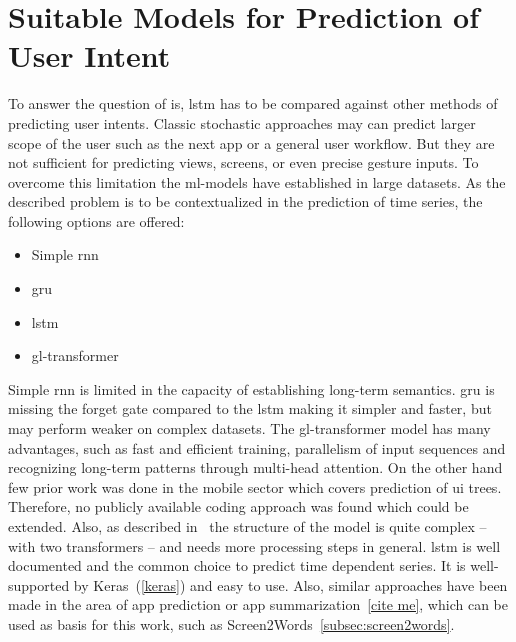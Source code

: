 

\section{Suitable Models for Prediction of User Intent}

To answer the question of  is, \gls{lstm} has to be compared against other methods of predicting user intents.
Classic stochastic approaches may can predict larger scope of the user such as the next app or a general user workflow.
But they are not sufficient for predicting views, screens, or even precise gesture inputs.
To overcome this limitation the \gls{ml}-models have established in large datasets.
As the described problem is to be contextualized in the prediction of time series, the following options are offered:
\begin{itemize}
    \item Simple \gls{rnn}
    \item \gls{gru}
    \item \gls{lstm}
    \item \gls{gl-transformer}
\end{itemize}

Simple \gls{rnn} is limited in the capacity of establishing long-term semantics.
\gls{gru} is missing the forget gate compared to the \gls{lstm} making it simpler and faster, but may perform weaker on complex datasets.
The \gls{gl-transformer} model has many advantages, such as fast and efficient training, parallelism of input sequences and recognizing long-term patterns through multi-head attention.
On the other hand few prior work was done in the mobile sector which covers prediction of \gls{ui} trees.
Therefore, no publicly available coding approach was found which could be extended.
Also, as described in~\cite{zhou2021large} the structure of the model is quite complex -- with two transformers -- and needs more processing steps in general.
\gls{lstm} is well documented and the common choice to predict time dependent series.
It is well-supported by Keras~(\ref{keras}) and easy to use.
Also, similar approaches have been made in the area of app prediction or app summarization~\ref{cite me}, which can be used as basis for this work, such as Screen2Words~\ref{subsec:screen2words}.


